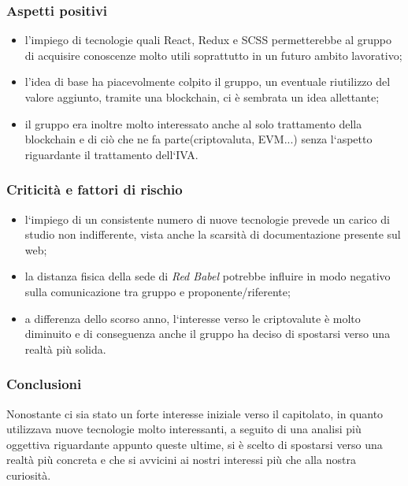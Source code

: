\documentclass{article}
\begin{document}
	
	\subsubsection{Aspetti positivi} 
	\begin{itemize}
		\item l'impiego di tecnologie quali React, Redux e SCSS permetterebbe al gruppo di acquisire conoscenze molto utili soprattutto in un futuro ambito lavorativo;
		
		\item l'idea di base ha piacevolmente colpito il gruppo, un eventuale riutilizzo del valore aggiunto, tramite una blockchain, ci è sembrata un idea allettante;
		
		\item il gruppo era inoltre molto interessato anche al solo trattamento della blockchain e di ciò che ne fa parte(criptovaluta, EVM...) senza l`aspetto riguardante il trattamento dell`IVA.
	\end{itemize}
	
	\subsubsection{Criticità e fattori di rischio}
	
	\begin{itemize}
	\item l`impiego di un consistente numero di nuove tecnologie prevede un carico di studio non indifferente, vista anche la scarsità di documentazione presente sul web;
	
	\item la distanza fisica della sede di \textit{Red Babel} potrebbe influire in modo negativo sulla comunicazione tra gruppo e proponente/riferente; 
	
	\item a differenza dello scorso anno, l`interesse verso le criptovalute è molto diminuito e di conseguenza anche il gruppo ha deciso di spostarsi verso una realtà più solida.  
	\end{itemize}
	
	\subsubsection{Conclusioni}
	Nonostante ci sia stato un forte interesse iniziale verso il capitolato, in quanto utilizzava nuove tecnologie molto interessanti, a seguito di una analisi più oggettiva riguardante appunto queste ultime, si è scelto di spostarsi verso una realtà più concreta e che si avvicini ai nostri interessi più che alla nostra curiosità.  
	
\end{document}
